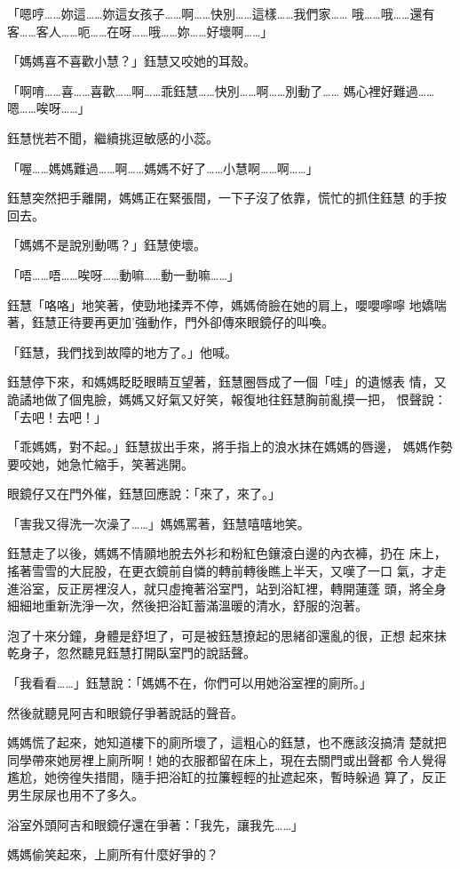 「嗯哼……妳這……妳這女孩子……啊……快別……這樣……我們家……
哦……哦……還有客……客人……呃……在呀……哦……妳……好壞啊……」

「媽媽喜不喜歡小慧？」鈺慧又咬她的耳殼。

「啊唷……喜……喜歡……啊……乖鈺慧……快別……啊……別動了……
媽心裡好難過……嗯……唉呀……」

鈺慧恍若不聞，繼續挑逗敏感的小蕊。

「喔……媽媽難過……啊……媽媽不好了……小慧啊……啊……」

鈺慧突然把手離開，媽媽正在緊張間，一下子沒了依靠，慌忙的抓住鈺慧
的手按回去。

「媽媽不是說別動嗎？」鈺慧使壞。

「唔……唔……唉呀……動嘛……動一動嘛……」

鈺慧「咯咯」地笑著，使勁地揉弄不停，媽媽倚臉在她的肩上，嚶嚶嚀嚀
地嬌喘著，鈺慧正待要再更加'強動作，門外卻傳來眼鏡仔的叫喚。

「鈺慧，我們找到故障的地方了。」他喊。

鈺慧停下來，和媽媽眨眨眼睛互望著，鈺慧圈唇成了一個「哇」的遺憾表
情，又詭譎地做了個鬼臉，媽媽又好氣又好笑，報復地往鈺慧胸前亂摸一把，
恨聲說：「去吧！去吧！」

「乖媽媽，對不起。」鈺慧拔出手來，將手指上的浪水抹在媽媽的唇邊，
媽媽作勢要咬她，她急忙縮手，笑著逃開。

眼鏡仔又在門外催，鈺慧回應說：「來了，來了。」

「害我又得洗一次澡了……」媽媽罵著，鈺慧嘻嘻地笑。

鈺慧走了以後，媽媽不情願地脫去外衫和粉紅色鑲滾白邊的內衣褲，扔在
床上，搖著雪雪的大屁股，在更衣鏡前自憐的轉前轉後瞧上半天，又嘆了一口
氣，才走進浴室，反正房裡沒人，就只虛掩著浴室門，站到浴缸裡，轉開蓮蓬
頭，將全身細細地重新洗淨一次，然後把浴缸蓄滿溫暖的清水，舒服的泡著。

泡了十來分鐘，身體是舒坦了，可是被鈺慧撩起的思緒卻還亂的很，正想
起來抹乾身子，忽然聽見鈺慧打開臥室門的說話聲。

「我看看……」鈺慧說：「媽媽不在，你們可以用她浴室裡的廁所。」

然後就聽見阿吉和眼鏡仔爭著說話的聲音。

媽媽慌了起來，她知道樓下的廁所壞了，這粗心的鈺慧，也不應該沒搞清
楚就把同學帶來她房裡上廁所啊！她的衣服都留在床上，現在去關門或出聲都
令人覺得尷尬，她徬徨失措間，隨手把浴缸的拉簾輕輕的扯遮起來，暫時躲過
算了，反正男生尿尿也用不了多久。

浴室外頭阿吉和眼鏡仔還在爭著：「我先，讓我先……」

媽媽偷笑起來，上廁所有什麼好爭的？

